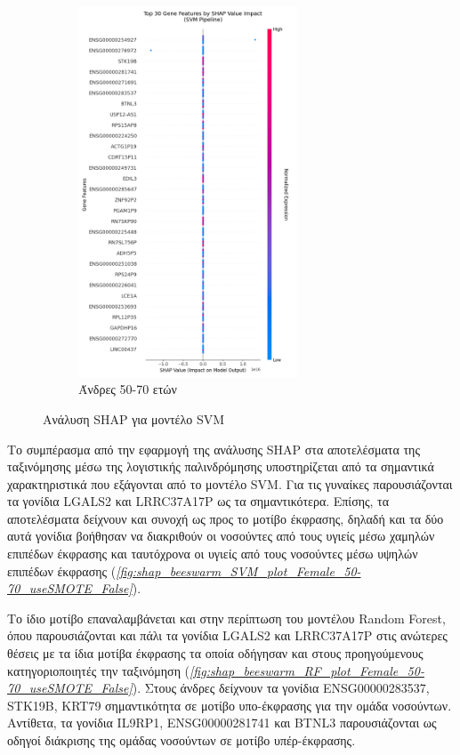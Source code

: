 \documentclass[12pt]{report}
\begin{document}
\begin{figure}[H]
\begin{subfigure}[b]{0.45\textwidth}
                    \includegraphics[height=11cm,width=\textwidth,keepaspectratio]{ML/Predict/DEG/SHAP/SVM/shap_beeswarm_plot_Male_50-70_useSMOTE_False.png}
                    \caption{Άνδρες 50-70 ετών}
                    \label{fig:shap_beeswarm_SVM_plot_Male_50-70_useSMOTE_False}
                \end{subfigure}
                \caption{Ανάλυση SHAP για μοντέλο SVM}
                \label{fig:beeswarm-shap-50-70-svm-classifier}
            \end{figure}
        \par
            Το συμπέρασμα από την εφαρμογή της ανάλυσης SHAP στα αποτελέσματα της ταξινόμησης μέσω της λογιστικής παλινδρόμησης υποστηρίζεται από τα σημαντικά χαρακτηριστικά που εξάγονται από το μοντέλο SVM. Για τις γυναίκες παρουσιάζονται τα γονίδια LGALS2 και LRRC37A17P ως τα σημαντικότερα. Επίσης, τα αποτελέσματα δείχνουν και συνοχή ως προς το μοτίβο έκφρασης, δηλαδή και τα δύο αυτά γονίδια βοήθησαν να διακριθούν οι νοσούντες από τους υγιείς μέσω χαμηλών επιπέδων έκφρασης και ταυτόχρονα οι υγιείς από τους νοσούντες μέσω υψηλών επιπέδων έκφρασης (\emph{\ref{fig:shap_beeswarm_SVM_plot_Female_50-70_useSMOTE_False}}).
        \par
            Το ίδιο μοτίβο επαναλαμβάνεται και στην περίπτωση του μοντέλου Random Forest, όπου παρουσιάζονται και πάλι τα γονίδια LGALS2 και LRRC37A17P στις ανώτερες θέσεις με τα ίδια μοτίβα έκφρασης τα οποία οδήγησαν και στους προηγούμενους κατηγοριοποιητές την ταξινόμηση (\emph{\ref{fig:shap_beeswarm_RF_plot_Female_50-70_useSMOTE_False}}). Στους άνδρες δείχνουν τα γονίδια ENSG00000283537, STK19B, KRT79 σημαντικότητα σε μοτίβο υπο-έκφρασης για την ομάδα νοσούντων. Αντίθετα, τα γονίδια IL9RP1, ENSG00000281741 και BTNL3 παρουσιάζονται ως οδηγοί διάκρισης της ομάδας νοσούντων σε μοτίβο υπέρ-έκφρασης.
\end{document}
